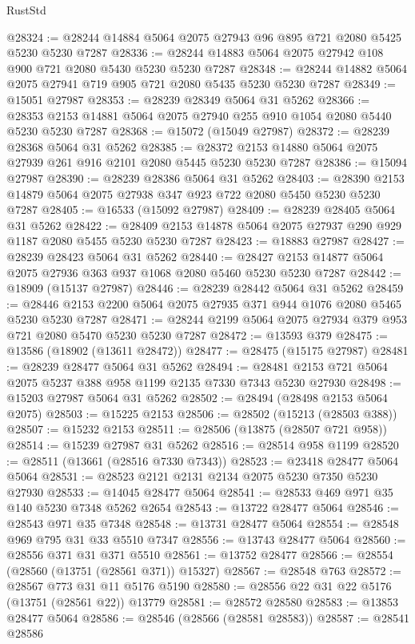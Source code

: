 \begin{lexlean}{RustStd}
\begin{coremodule}
@28324 := @28244 @14884 @5064 @2075 @27943 @96 @895 @721 @2080 @5425 @5230 @5230 @7287
@28336 := @28244 @14883 @5064 @2075 @27942 @108 @900 @721 @2080 @5430 @5230 @5230 @7287
@28348 := @28244 @14882 @5064 @2075 @27941 @719 @905 @721 @2080 @5435 @5230 @5230 @7287
@28349 := @15051 @27987
@28353 := @28239 @28349 @5064 @31 @5262
@28366 := @28353 @2153 @14881 @5064 @2075 @27940 @255 @910 @1054 @2080 @5440 @5230 @5230 @7287
@28368 := @15072 (@15049 @27987)
@28372 := @28239 @28368 @5064 @31 @5262
@28385 := @28372 @2153 @14880 @5064 @2075 @27939 @261 @916 @2101 @2080 @5445 @5230 @5230 @7287
@28386 := @15094 @27987
@28390 := @28239 @28386 @5064 @31 @5262
@28403 := @28390 @2153 @14879 @5064 @2075 @27938 @347 @923 @722 @2080 @5450 @5230 @5230 @7287
@28405 := @16533 (@15092 @27987)
@28409 := @28239 @28405 @5064 @31 @5262
@28422 := @28409 @2153 @14878 @5064 @2075 @27937 @290 @929 @1187 @2080 @5455 @5230 @5230 @7287
@28423 := @18883 @27987
@28427 := @28239 @28423 @5064 @31 @5262
@28440 := @28427 @2153 @14877 @5064 @2075 @27936 @363 @937 @1068 @2080 @5460 @5230 @5230 @7287
@28442 := @18909 (@15137 @27987)
@28446 := @28239 @28442 @5064 @31 @5262
@28459 := @28446 @2153 @2200 @5064 @2075 @27935 @371 @944 @1076 @2080 @5465 @5230 @5230 @7287
@28471 := @28244 @2199 @5064 @2075 @27934 @379 @953 @721 @2080 @5470 @5230 @5230 @7287
@28472 := @13593 @379
@28475 := @13586 (@18902 (@13611 @28472))
@28477 := @28475 (@15175 @27987)
@28481 := @28239 @28477 @5064 @31 @5262
@28494 := @28481 @2153 @721 @5064 @2075 @5237 @388 @958 @1199 @2135 @7330 @7343 @5230 @27930
@28498 := @15203 @27987 @5064 @31 @5262
@28502 := @28494 (@28498 @2153 @5064 @2075)
@28503 := @15225 @2153
@28506 := @28502 (@15213 (@28503 @388))
@28507 := @15232 @2153
@28511 := @28506 (@13875 (@28507 @721 @958))
@28514 := @15239 @27987 @31 @5262
@28516 := @28514 @958 @1199
@28520 := @28511 (@13661 (@28516 @7330 @7343))
@28523 := @23418 @28477 @5064 @5064
@28531 := @28523 @2121 @2131 @2134 @2075 @5230 @7350 @5230 @27930
@28533 := @14045 @28477 @5064
@28541 := @28533 @469 @971 @35 @140 @5230 @7348 @5262 @2654
@28543 := @13722 @28477 @5064
@28546 := @28543 @971 @35 @7348
@28548 := @13731 @28477 @5064
@28554 := @28548 @969 @795 @31 @33 @5510 @7347
@28556 := @13743 @28477 @5064
@28560 := @28556 @371 @31 @371 @5510
@28561 := @13752 @28477
@28566 := @28554 (@28560 (@13751 (@28561 @371)) @15327)
@28567 := @28548 @763
@28572 := @28567 @773 @31 @11 @5176 @5190
@28580 := @28556 @22 @31 @22 @5176 (@13751 (@28561 @22)) @13779
@28581 := @28572 @28580
@28583 := @13853 @28477 @5064
@28586 := @28546 (@28566 (@28581 @28583))
@28587 := @28541 @28586

\end{coremodule}
\end{lexlean}
